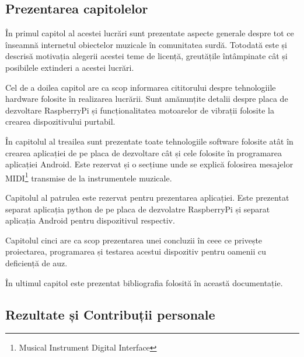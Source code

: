 \documentclass[../IoMusT.tex]{subfiles}
\begin{document}
\subsection{Prezentarea capitolelor}
În primul capitol al acestei lucrări sunt prezentate aspecte generale des\-pre tot ce înseamnă internetul obiectelor muzicale în comunitatea surdă. Tot\-o\-da\-tă este și descrisă motivația alegerii acestei teme de licență, greutățile întâmpinate cât și posibilele extinderi a acestei lucrări.
\\
\par Cel de a doilea capitol are ca scop informarea cititorului despre tehnologiile hardware folosite în realizarea lucrării. Sunt amănunțite detalii despre placa de dezvoltare RaspberryPi și funcționalitatea motoarelor de vibrații folosite la crearea dispozitivului purtabil.
\\
\par În capitolul al treailea sunt prezentate toate tehnologiile software folosite atât în crearea aplicației de pe placa de dezvoltare cât și cele folosite în programarea aplicației Android. Este rezervat și o secțiune unde se explică folosirea mesajelor MIDI\footnote{Musical Instrument Digital Interface} transmise de la instrumentele muzicale.
\\
\par Capitolul al patrulea este rezervat pentru prezentarea aplicației. Este prezentat separat aplicația python de pe placa de dezvolatre RaspberryPi și separat aplicația Android pentru dispozitivul respectiv.
\\
\par Capitolul cinci are ca scop prezentarea unei concluzii în ceee ce privește proiectarea, programarea și testarea acestui dispozitiv pentru oamenii cu deficiență de auz.
\\
\par În ultimul capitol este prezentat bibliografia folosită în această documentație.
\subsection{Rezultate și Contribuții personale}
\end{document}
